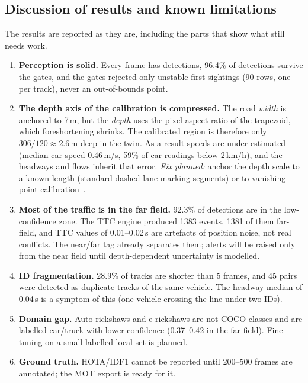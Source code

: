 \documentclass[11pt,a4paper]{article}
\begin{document}
\subsection{Discussion of results and known limitations}
The results are reported as they are, including the parts that show what still needs work.
\begin{enumerate}
  \item \textbf{Perception is solid.} Every frame has detections, 96.4\% of detections survive the gates, and the gates
        rejected only unstable first sightings (90 rows, one per track), never an out-of-bounds point.
  \item \textbf{The depth axis of the calibration is compressed.} The road \emph{width} is anchored to 7\,m, but the
        \emph{depth} uses the pixel aspect ratio of the trapezoid, which foreshortening shrinks. The calibrated region is
        therefore only $306/120 \approx 2.6$\,m deep in the twin. As a result speeds are under-estimated
        (median car speed 0.46\,m/s, 59\% of car readings below 2\,km/h), and the headways and flows inherit that error.
        \emph{Fix planned:} anchor the depth scale to a known length (standard dashed lane-marking segments) or to
        vanishing-point calibration~\cite{dubska2014}.
  \item \textbf{Most of the traffic is in the far field.} 92.3\% of detections are in the low-confidence zone. The
        TTC engine produced 1383 events, 1381 of them far-field, and TTC values of 0.01--0.02\,s are artefacts of
        position noise, not real conflicts. The near/far tag already separates them; alerts will be raised only from the
        near field until depth-dependent uncertainty is modelled.
  \item \textbf{ID fragmentation.} 28.9\% of tracks are shorter than 5 frames, and 45 pairs were detected as duplicate
        tracks of the same vehicle. The headway median of 0.04\,s is a symptom of this (one vehicle crossing the line
        under two IDs).
  \item \textbf{Domain gap.} Auto-rickshaws and e-rickshaws are not COCO classes and are labelled car/truck with
        lower confidence (0.37--0.42 in the far field). Fine-tuning on a small labelled local set is planned.
  \item \textbf{Ground truth.} HOTA/IDF1 cannot be reported until 200--500 frames are annotated; the MOT export is ready for it.
\end{enumerate}
\end{document}
